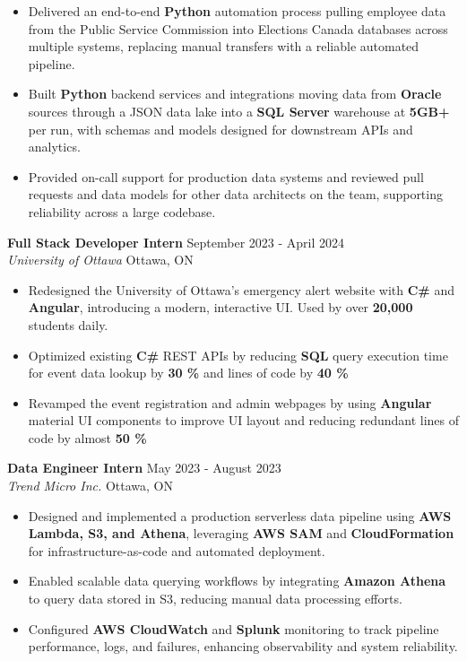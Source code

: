 \documentclass[a4paper]{article}
\begin{document}
\begin{itemize}
\item Delivered an end-to-end \textbf{Python} automation process pulling employee data from the Public Service Commission into Elections Canada databases across multiple systems, replacing manual transfers with a reliable automated pipeline.

\item Built \textbf{Python} backend services and integrations moving data from \textbf{Oracle} sources through a JSON data lake into a \textbf{SQL Server} warehouse at \textbf{5GB+} per run, with schemas and models designed for downstream APIs and analytics.

\item Provided on-call support for production data systems and reviewed pull requests and data models for other data architects on the team, supporting reliability across a large codebase.

\end{itemize}

\textbf{Full Stack Developer Intern } \hfill September 2023 - April 2024\\
\textit{University of Ottawa} \hfill Ottawa, ON\\
\vspace{-2mm}
\begin{itemize} \itemsep -4pt
    \item Redesigned the University of Ottawa's emergency alert website with \textbf{C\#} and \textbf{Angular}, introducing a modern, interactive UI. Used by over \textbf{20,000} students daily.
     \item Optimized existing \textbf{C\#} REST APIs by reducing \textbf{SQL} query execution time for event data lookup by \textbf{30 \%} and lines of code by \textbf{40 \%}
    \item Revamped the event registration and admin webpages by using \textbf{Angular} material UI components to improve UI layout and reducing redundant lines of code by almost \textbf{50 \%}
\end{itemize}

\textbf{Data Engineer Intern} \hfill May 2023 - August 2023\\
\textit{Trend Micro Inc.} \hfill Ottawa, ON\\
\vspace{-2mm}
\begin{itemize} \itemsep -4pt

\item Designed and implemented a production serverless data pipeline using \textbf{AWS Lambda, S3, and Athena}, leveraging \textbf{AWS SAM} and \textbf{CloudFormation} for infrastructure-as-code and automated deployment.

\item Enabled scalable data querying workflows by integrating \textbf{Amazon Athena} to query data stored in S3, reducing manual data processing efforts.

\item Configured \textbf{AWS CloudWatch} and \textbf{Splunk} monitoring to track pipeline performance, logs, and failures, enhancing observability and system reliability.

\end{itemize}
\end{document}
